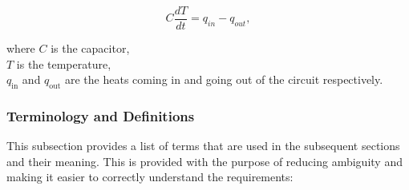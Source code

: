 \begin{equation}
C\frac{ dT}{dt} = q_{in}-q_{out}, \label{eq:34} 
\end{equation}

where $C$ is the capacitor,\\
$T$ is the temperature,\\
$q_{\text{in}}$ and $q_{\text{out}}$ are the heats coming in and going out of the circuit respectively.\\

\subsubsection{Terminology and  Definitions}

This subsection provides a list of terms that are used in the subsequent
sections and their meaning. This is provided with the purpose of reducing
ambiguity and making it easier to correctly understand the requirements:

